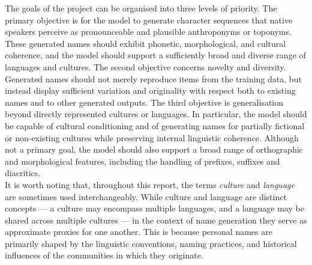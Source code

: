 \documentclass[Main.tex]{subfiles}
\begin{document}
The goals of the project can be organised into three levels of priority.
The primary objective is for the model to generate character sequences that native speakers perceive as pronounceable and plausible anthroponyms or toponyms. These generated names should exhibit phonetic, morphological, and cultural coherence, and the model should support a sufficiently broad and diverse range of languages and cultures.
The second objective concerns novelty and diversity. Generated names should not merely reproduce items from the training data, but instead display sufficient variation and originality with respect both to existing names and to other generated outputs.
The third objective is generalisation beyond directly represented cultures or languages. In particular, the model should be capable of cultural conditioning and of generating names for partially fictional or non-existing cultures while preserving internal linguistic coherence.
Although not a primary goal, the model should also support a broad range of orthographic and morphological features, including the handling of prefixes, suffixes and diacritics.\\

It is worth noting that, throughout this report, the terms \textit{culture} and \textit{language} are sometimes used interchangeably. While culture and language are distinct concepts — a culture may encompass multiple languages, and a language may be shared across multiple cultures — in the context of name generation they serve as approximate proxies for one another. This is because personal names are primarily shaped by the linguistic conventions, naming practices, and historical influences of the communities in which they originate.\\


\end{document}
